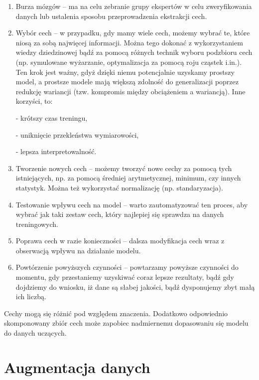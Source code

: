 \begin{enumerate}
	\item Burza mózgów – ma na celu zebranie grupy ekspertów w celu zweryfikowania danych lub ustalenia sposobu przeprowadzenia ekstrakcji cech.

	\item Wybór cech – w przypadku, gdy mamy wiele cech, możemy wybrać te, które niosą za sobą najwięcej informacji. Można tego dokonać z wykorzystaniem wiedzy dziedzinowej bądź za pomocą różnych technik wyboru podzbioru cech (np. symulowane wyżarzanie, optymalizacja za pomocą roju cząstek i.in.). Ten krok jest ważny, gdyż dzięki niemu potencjalnie uzyskamy prostszy model, a prostsze modele mają większą zdolność do generalizacji poprzez redukcję wariancji (tzw. kompromis między obciążeniem a wariancją). Inne korzyści, to:

	- krótszy czas treningu,

	- uniknięcie przekleństwa wymiarowości,

	- lepsza interpretowalność.

	\item Tworzenie nowych cech – możemy tworzyć nowe cechy za pomocą tych istniejących, np. za pomocą średniej arytmetycznej, minimum, czy innych statystyk. Można też wykorzystać normalizację (np. standaryzacja).

	\item Testowanie wpływu cech na model – warto zautomatyzować ten proces, aby wybrać jak taki zestaw cech, który najlepiej się sprawdza na danych treningowych.

	\item Poprawa cech w razie konieczności – dalsza modyfikacja cech wraz z obserwacją wpływu na działanie modelu.

	\item Powtórzenie powyższych czynności – powtarzamy powyższe czynności do momentu, gdy przestaniemy uzyskiwać coraz lepsze rezultaty, bądź gdy dojdziemy do wniosku, iż dane są słabej jakości, bądź dysponujemy zbyt małą ich liczbą.
\end{enumerate}

Cechy mogą się różnić pod względem znaczenia. Dodatkowo odpowiednio skomponowany zbiór cech może zapobiec nadmiernemu dopasowaniu się modelu do danych uczących. 

\section{Augmentacja danych}
\label{cha:cha3.4}

